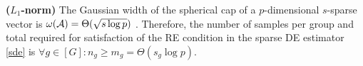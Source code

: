 \begin{example}
	{\bf ($L_1$-norm)} The Gaussian width of the spherical cap of a $p$-dimensional $s$-sparse vector is $\omega({\cal A}) = \Theta(\sqrt{s\log p})$ \cite{banerjee14, vershynin2018high}. Therefore, the number of samples per group and total required for satisfaction of the RE condition in the sparse DE estimator \eqref{sde} is $\forall g \in [G]: n_g \geq m_g = \Theta(s_g \log p)$. 
\end{example}



